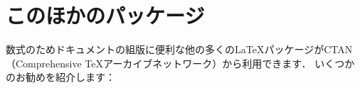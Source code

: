
\section{このほかのパッケージ}
\label{other-packages}

数式のためドキュメントの組版に便利な他の多くの\LaTeX{}パッケージがCTAN（Comprehensive \TeX{}アーカイブネットワーク）から利用できます． 
いくつかのお勧めを紹介します：
